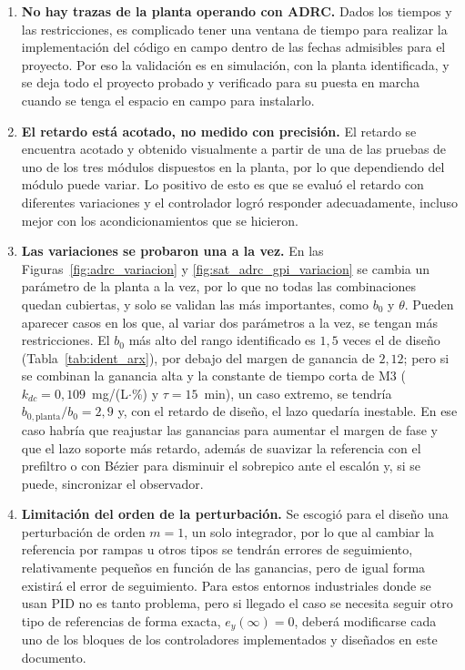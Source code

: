 \begin{enumerate}
  \item \textbf{No hay trazas de la planta operando con ADRC.} Dados los tiempos y las restricciones,
  es complicado tener una ventana de tiempo para realizar la implementación del código en campo dentro
  de las fechas admisibles para el proyecto. Por eso la validación es en simulación, con la planta
  identificada, y se deja todo el proyecto probado y verificado para su puesta en marcha cuando se tenga
  el espacio en campo para instalarlo. 



  \item \textbf{El retardo está acotado, no medido con precisión.} El retardo se encuentra acotado y
  obtenido visualmente a partir de una de las pruebas de uno de los tres módulos dispuestos en la
  planta, por lo que dependiendo del módulo puede variar. Lo positivo de esto es que se evaluó el
  retardo con diferentes variaciones y el controlador logró responder adecuadamente, incluso mejor con
  los acondicionamientos que se hicieron.

  \item \textbf{Las variaciones se probaron una a la vez.} En las
  Figuras~\ref{fig:adrc_variacion} y \ref{fig:sat_adrc_gpi_variacion} se cambia un parámetro de la
  planta a la vez, por lo que no todas las combinaciones quedan cubiertas, y solo se validan las
  más importantes, como $b_0$ y $\theta$. Pueden aparecer casos en los que, al variar dos
  parámetros a la vez, se tengan más restricciones. El $b_0$ más alto del rango identificado es
  $1{,}5$ veces el de diseño (Tabla~\ref{tab:ident_arx}), por debajo del margen de ganancia de
  $2{,}12$; pero si se combinan la ganancia alta y la constante de tiempo corta de M3
  ($k_{dc} = 0{,}109$~mg/(L$\cdot$\%) y $\tau = 15$~min), un caso extremo, se tendría
  $b_{0,\mathrm{planta}}/b_0 = 2{,}9$ y, con el retardo de diseño, el lazo quedaría
  inestable. En ese caso habría que reajustar las ganancias para aumentar el margen de fase y que el
  lazo soporte más retardo, además de suavizar la referencia con el prefiltro o con Bézier para
  disminuir el sobrepico ante el escalón y, si se puede, sincronizar el observador.

  \item \textbf{Limitación del orden de la perturbación.} Se escogió para el diseño una perturbación de
  orden $m = 1$, un solo integrador, por lo que al cambiar la referencia por rampas u otros tipos se
  tendrán errores de seguimiento, relativamente pequeños en función de las ganancias, pero de igual forma existirá el error de seguimiento. Para estos entornos industriales
  donde se usan PID no es tanto problema, pero si llegado el caso se necesita seguir otro tipo de
  referencias de forma exacta, $e_y(\infty) = 0$, deberá modificarse cada uno de los bloques de los
  controladores implementados y diseñados en este documento.
\end{enumerate}

